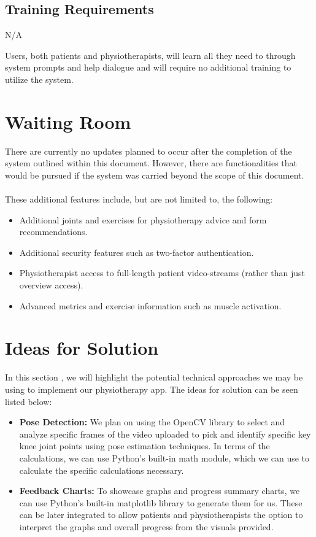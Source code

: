 \documentclass[12pt]{article}
\begin{document}
\subsection{Training Requirements}
N/A

Users, both patients and physiotherapists, will learn all they need to through system prompts and help dialogue and will require no additional training to utilize the system.


\section{Waiting Room}
There are currently no updates planned to occur after the completion of the system outlined within this document. However, there are functionalities that would be pursued if the system was carried beyond the scope of this document.\\ \\
These additional features include, but are not limited to, the following:
\begin{itemize}
  \item Additional joints and exercises for physiotherapy advice and form recommendations.
  \item Additional security features such as two-factor authentication.
  \item Physiotherapist access to full-length patient video-streams (rather than just overview access).
  \item Advanced metrics and exercise information such as muscle activation.
\end{itemize}

\section{Ideas for Solution}
In this section , we will highlight the potential technical approaches we may be using to implement our physiotherapy app. 
The ideas for solution can be seen listed below:

\begin{itemize}
  \item \textbf{Pose Detection:}  We plan on using the OpenCV library to select 
  and analyze specific frames of the video uploaded to pick and identify specific key knee joint points using pose estimation 
  techniques. In terms of the calculations, we can use Python’s built-in math module, which we can use to calculate the specific 
  calculations necessary.
  \item \textbf{Feedback Charts:} To showcase graphs and progress summary charts, we can use Python’s built-in matplotlib 
  library to generate them for us. These can be later integrated to allow patients and physiotherapists the 
  option to interpret the graphs and overall progress from the visuals provided.
\end{itemize}
\end{document}
